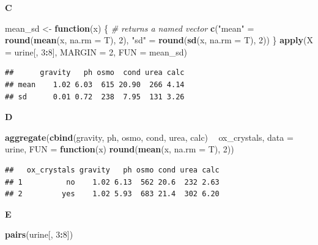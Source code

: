 \documentclass[]{book}
\newenvironment{Shaded}{\begin{snugshade}}{\end{snugshade}}
\newcommand{\CommentTok}[1]{\textcolor[rgb]{0.56,0.35,0.01}{\textit{#1}}}
\newcommand{\ControlFlowTok}[1]{\textcolor[rgb]{0.13,0.29,0.53}{\textbf{#1}}}
\newcommand{\DataTypeTok}[1]{\textcolor[rgb]{0.13,0.29,0.53}{#1}}
\newcommand{\DecValTok}[1]{\textcolor[rgb]{0.00,0.00,0.81}{#1}}
\newcommand{\KeywordTok}[1]{\textcolor[rgb]{0.13,0.29,0.53}{\textbf{#1}}}
\newcommand{\NormalTok}[1]{#1}
\newcommand{\OperatorTok}[1]{\textcolor[rgb]{0.81,0.36,0.00}{\textbf{#1}}}
\newcommand{\StringTok}[1]{\textcolor[rgb]{0.31,0.60,0.02}{#1}}
\begin{document}
\textbf{C}

\begin{Shaded}
\begin{Highlighting}[]
\NormalTok{mean_sd <-}\StringTok{ }\ControlFlowTok{function}\NormalTok{(x) \{}
    \CommentTok{# returns a named vector}
    \KeywordTok{c}\NormalTok{(}\StringTok{"mean"}\NormalTok{ =}\StringTok{ }\KeywordTok{round}\NormalTok{(}\KeywordTok{mean}\NormalTok{(x, }\DataTypeTok{na.rm =}\NormalTok{ T), }\DecValTok{2}\NormalTok{), }
      \StringTok{"sd"}\NormalTok{ =}\StringTok{ }\KeywordTok{round}\NormalTok{(}\KeywordTok{sd}\NormalTok{(x, }\DataTypeTok{na.rm =}\NormalTok{ T), }\DecValTok{2}\NormalTok{))}
\NormalTok{\}}
\KeywordTok{apply}\NormalTok{(}\DataTypeTok{X =}\NormalTok{ urine[, }\DecValTok{3}\OperatorTok{:}\DecValTok{8}\NormalTok{], }\DataTypeTok{MARGIN =} \DecValTok{2}\NormalTok{, }\DataTypeTok{FUN =}\NormalTok{ mean_sd)}
\end{Highlighting}
\end{Shaded}

\begin{verbatim}
##      gravity   ph osmo  cond urea calc
## mean    1.02 6.03  615 20.90  266 4.14
## sd      0.01 0.72  238  7.95  131 3.26
\end{verbatim}

\textbf{D}

\begin{Shaded}
\begin{Highlighting}[]
\KeywordTok{aggregate}\NormalTok{(}\KeywordTok{cbind}\NormalTok{(gravity, ph, osmo, cond, urea, calc) }\OperatorTok{~}\StringTok{ }\NormalTok{ox_crystals, }
          \DataTypeTok{data =}\NormalTok{ urine, }
          \DataTypeTok{FUN =} \ControlFlowTok{function}\NormalTok{(x) }\KeywordTok{round}\NormalTok{(}\KeywordTok{mean}\NormalTok{(x, }\DataTypeTok{na.rm =}\NormalTok{ T), }\DecValTok{2}\NormalTok{))}
\end{Highlighting}
\end{Shaded}

\begin{verbatim}
##   ox_crystals gravity   ph osmo cond urea calc
## 1          no    1.02 6.13  562 20.6  232 2.63
## 2         yes    1.02 5.93  683 21.4  302 6.20
\end{verbatim}

\textbf{E}

\begin{Shaded}
\begin{Highlighting}[]
\KeywordTok{pairs}\NormalTok{(urine[, }\DecValTok{3}\OperatorTok{:}\DecValTok{8}\NormalTok{])}
\end{Highlighting}
\end{Shaded}
\end{document}
